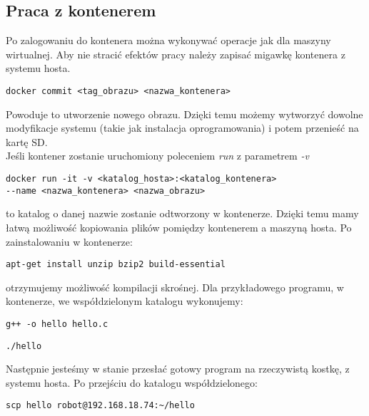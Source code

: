 \documentclass{article}
\begin{document}
\subsection{Praca z kontenerem}
Po zalogowaniu do kontenera można wykonywać operacje jak dla maszyny wirtualnej. Aby nie stracić efektów pracy należy zapisać migawkę kontenera z systemu hosta.
\begin{lstlisting}
docker commit <tag_obrazu> <nazwa_kontenera> 
\end{lstlisting}
Powoduje to utworzenie nowego obrazu. Dzięki temu możemy wytworzyć dowolne modyfikacje systemu (takie jak instalacja oprogramowania) i potem przenieść na kartę SD.\\
Jeśli kontener zostanie uruchomiony poleceniem \textit{run} z parametrem \textit{-v} 
\begin{lstlisting}
docker run -it -v <katalog_hosta>:<katalog_kontenera> 
--name <nazwa_kontenera> <nazwa_obrazu>
\end{lstlisting}
to katalog o danej nazwie zostanie odtworzony w kontenerze. Dzięki temu mamy łatwą możliwość kopiowania plików pomiędzy kontenerem a maszyną hosta. Po zainstalowaniu w kontenerze:
\begin{lstlisting}
apt-get install unzip bzip2 build-essential
\end{lstlisting}
otrzymujemy możliwość kompilacji skrośnej.
Dla przykładowego programu, w kontenerze, we współdzielonym katalogu wykonujemy:
\begin{lstlisting}
g++ -o hello hello.c
\end{lstlisting}
\begin{lstlisting}
./hello
\end{lstlisting}
Następnie jesteśmy w stanie przesłać gotowy program na rzeczywistą kostkę, z systemu hosta. Po przejściu do katalogu współdzielonego:
\begin{lstlisting}
scp hello robot@192.168.18.74:~/hello
\end{lstlisting}
\end{document}
